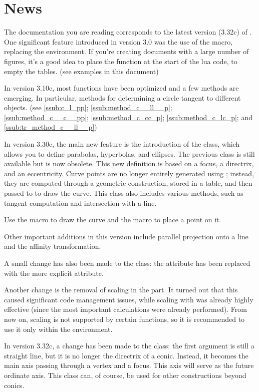 \section{News} %
\label{sec:news}

The documentation you are reading corresponds to the latest version (3.32c) of .
One significant feature introduced in version 3.0 was the use of the  macro, replacing the  environment. If you're creating documents with a large number of figures, it's a good idea to place the  function at the start of the lua code, to empty the tables. (see examples in this document)


In  version  3.10c, most functions have been optimized and a few methods are emerging. In particular, methods for determining a circle tangent to different objects. (see \ref{ssub:c_l_pp}; \ref{ssub:method_c__ll__p}; \ref{ssub:method_c__c__pp}; \ref{ssub:method_c_cc_p}; \ref{ssub:method_c_lc_p}; and \ref{ssub:tr_method_c__ll__p})

In version 3.30c, the main new feature is the introduction of the  class, which allows you to define parabolas, hyperbolas, and ellipses. The previous  class is still available but is now obsolete. This new definition is based on a focus, a directrix, and an eccentricity. Curve points are no longer entirely generated using \TIKZ{}; instead, they are computed through a geometric construction, stored in a table, and then passed to \TIKZ{} to draw the curve. This class also includes various methods, such as tangent computation and intersection with a line.

Use the  macro to draw the curve and the  macro to place a point on it.

Other important additions in this version include parallel projection onto a line and the affinity transformation.

A small change has also been made to the  class: the  attribute has been replaced with the more explicit  attribute.

Another change is the removal of scaling in the  part. It turned out that this caused significant code management issues, while scaling with \TIKZ{} was already highly effective (since the most important calculations were already performed). From now on, scaling is not supported by certain functions, so it is recommended to use it only within the  environment.

In version 3.32c, a change has been made to the  class: the first argument is still a straight line, but it is no longer the directrix of a conic. Instead, it becomes the main axis passing through a vertex and a focus. This axis will serve as the future ordinate axis. This class can, of course, be used for other constructions beyond conics.

\endinput

